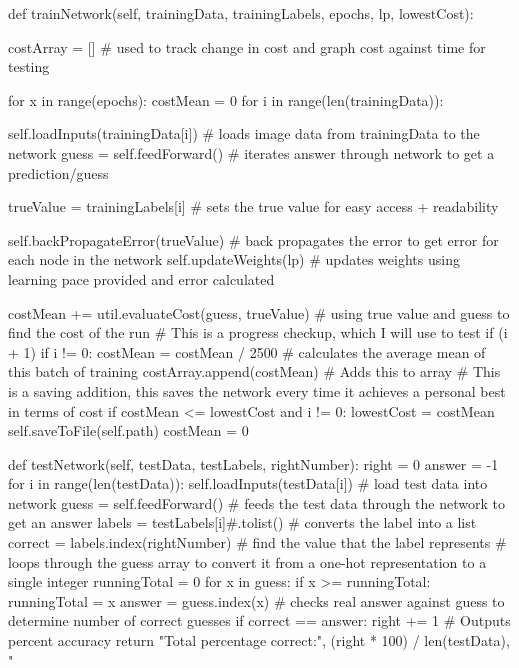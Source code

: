\documentclass{report}
\begin{document}
\begin{python}
    def trainNetwork(self, trainingData, trainingLabels, epochs, lp, lowestCost):

        costArray = []  # used to track change in cost and graph cost against time for testing

        for x in range(epochs):
            costMean = 0
            for i in range(len(trainingData)):

                self.loadInputs(trainingData[i])  # loads image data from trainingData to the network
                guess = self.feedForward()  # iterates answer through network to get a prediction/guess

                trueValue = trainingLabels[i]  # sets the true value for easy access + readability

                self.backPropagateError(trueValue)  # back propagates the error to get error for each node in the network
                self.updateWeights(lp)  # updates weights using learning pace provided and error calculated

                costMean += util.evaluateCost(guess, trueValue)  # using true value and guess to find the cost of the run
                # This is a progress checkup, which I will use to test
                if (i + 1) %
                    if i != 0:
                        costMean = costMean / 2500  # calculates the average mean of this batch of training
                    costArray.append(costMean)  # Adds this to array
                    # This is a saving addition, this saves the network every time it achieves a personal best in terms of cost
                    if costMean <= lowestCost and i != 0:
                        lowestCost = costMean
                        self.saveToFile(self.path)
                    costMean = 0

    def testNetwork(self, testData, testLabels, rightNumber):
        right = 0
        answer = -1
        for i in range(len(testData)):
            self.loadInputs(testData[i])  # load test data into network
            guess = self.feedForward()  # feeds the test data through the network to get an answer
            labels = testLabels[i]#.tolist()  # converts the label into a list
            correct = labels.index(rightNumber)  # find the value that the label represents
            # loops through the guess array to convert it from a one-hot representation to a single integer
            runningTotal = 0
            for x in guess:
                if x >= runningTotal:
                    runningTotal = x
                    answer = guess.index(x)
            # checks real answer against guess to determine number of correct guesses
            if correct == answer:
                right += 1
        # Outputs percent accuracy
        return "Total percentage correct:", (right * 100) / len(testData), "%
\end{python}
\newpage
\end{document}
